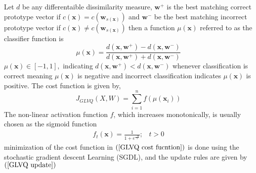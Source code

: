 \documentclass[english]{HSMW-Thesis}
\begin{document}
Let\hspace{2pt} $d$\hspace{2pt} be any differentaible dissimilarity measure, \hspace{2pt}$\mathbf{w}^{+}$ \hspace{2pt}is the best matching correct prototype vector if\hspace{2pt} $c\left( \mathbf{x}\right) = c\left( \mathbf{w}_{ s\left( \mathbf{x}\right) }\right)$
and\hspace{2pt} $\mathbf{w}^{-}$\hspace{2pt} be the best matching incorrect prototype vector if\hspace{2pt} $c\left( \mathbf{x}\right) \neq c\left( \mathbf{w}_{ s\left( \mathbf{x}\right) }\right)$\hspace{2pt} then a function\hspace{2pt} $\mu\left( \mathbf{x}\right)$\hspace{2pt} referred to as the classifier function is
\begin{equation*}%
	\mu \left( \mathbf{x}\right) =\frac{d\left( \mathbf{x},\mathbf{w}^{+}\right)-d\left( \mathbf{x},\mathbf{w}^{-}\right)  }{d\left( \mathbf{x},\mathbf{w}^{+}\right)+d\left( \mathbf{x},\mathbf{w}^{-} \right) }
\end{equation*}
$\mu\left( \mathbf{x}\right)\in\left[ -1,1\right], $ indicating\hspace{2pt} $d\left( \mathbf{x},\mathbf{w}^{+}\right)<d\left( \mathbf{x},\mathbf{w}^{-}\right)$\hspace{2pt} whenever classification is correct  meaning\hspace{2pt} $\mu\left( \mathbf{x}\right) $\hspace{2pt} is negative and incorrect classification indicates\hspace{2pt} $\mu\left( \mathbf{x}\right) $ \hspace{2pt}is positive. The cost function is given by,
\begin{equation}\label{GLVQ cost fucntion}
	J_{GLVQ}\left( X,W\right) =\sum_{i=1}^{n}f\left( \mu\left( \mathbf{x}_i\right) \right) 
\end{equation}
The non-linear activation function $f$, which increases monotonically, is usually chosen as the sigmoid function 
\begin{align*}
	f_t\left( \mathbf{x}\right) =\frac{1}{1+e^{\frac{-\mathbf{x}}{t}}} ;\hspace{10pt} t>0
\end{align*}
minimization of the cost function in  $\left( \ref{GLVQ cost fucntion}\right)$ is done using the stochastic gradient descent Learning (SGDL), and the update rules are given by $\left( \ref{GLVQ update}\right) $
\end{document}

